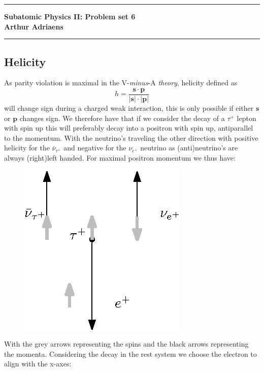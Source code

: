 \documentclass[10pt,a4paper,twoside]{article}
\begin{document}
	\begin{center}
		\hrule
		\vspace{.4cm}
		{\bf {\huge Subatomic Physics II: Problem set 6}}
		\vspace{.2cm}
		\\
		{\bf Arthur Adriaens}
		\vspace{.2cm}
		\hrule
	\end{center}
\subsection{Helicity}
As parity violation is maximal in the V-\textit{minus}-A \textit{theory}, helicity defined as 
\begin{equation}
	h = \frac{\boldsymbol{s}\cdot\boldsymbol{p}}{|\boldsymbol{s}|\cdot|\boldsymbol{p}|}
\end{equation}
will change sign during a charged weak interaction, this is only possible if either $\boldsymbol{s}$ or $\boldsymbol{p}$ changes sign. We therefore have that if we consider the decay of a $\tau^+$ lepton with spin up this will preferably decay into a positron with spin up, antiparallel to the momentum. With the neutrino's traveling the other direction with positive helicity for the $\bar{\nu}_{\tau^+}$ and negative for the $\nu_{e^+}$ neutrino as (anti)neutrino's are always (right)left handed. For maximal positron momentum we thus have:
\begin{figure}[H]
	\centering
	\includegraphics{decay.eps}
\end{figure}
\noindent
With the grey arrows representing the spins and the black arrows representing the momenta.
Considering the decay in the rest system we choose the electron to align with the x-axes:
\end{document}

